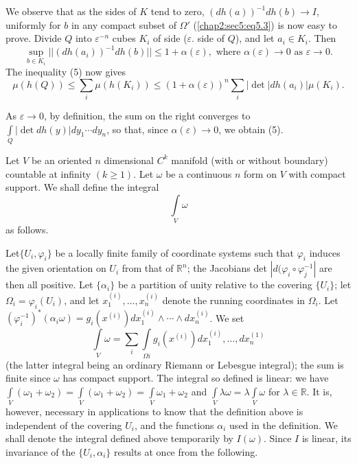 We observe that as the sides of $K$ tend to zero, $(dh(a))^{-1} dh(b)
\to I$, uniformly for $b$ in any compact subset of $\Omega '$
(\ref{chap2:sec5:eq5.3}) is
now easy to prove. Divide $Q$ into $\varepsilon^{-n}$ cubes $K_i$ of
side ($\varepsilon$. side of $Q$), and let $a_i \in K_i$. Then 
$$
\sup_{b \in K_i} || (dh(a_i))^{-1} dh(b) || \leq 1 + \alpha
(\varepsilon), \text{ where } \alpha (\varepsilon) \to 0 \text{ as  }
\varepsilon \to 0. 
$$
The inequality (5) now gives	
$$
\mu (h(Q)) \leq \sum_i \mu (h(K_i)) \leq (1 + \alpha (\varepsilon))^n
\sum_i |\det| dh(a_i) | \mu (K_i). 
$$

As $\varepsilon \to 0$, by definition, the sum on the right converges
to $\int \limits_{Q} |\det dh(y)| dy_{1}\cdots dy_n$, so that, since
$\alpha (\varepsilon) \to 0$, we obtain (5). 


Let $V$ be an oriented $n$ dimensional $C^k$ manifold (with or without
boundary) countable at infinity $(k \geq 1)$. Let $\omega$ be a
continuous $n$ form on $V$ with compact support. We shall define the
integral  
$$
\int \limits_V \omega
$$
as follows.

Let\pageoriginale $\{ U_i, \varphi_i\}$ be a locally finite family of coordinate
systems such that $\varphi_i$ induces the given orientation on $U_i$
from that  of $\mathbb{R}^n$; the Jacobians det $ | d (\varphi_i \circ
\varphi^{-1}_j |$ are then all positive. Let $\{\alpha_i \}$ be a
partition of unity relative to the covering $\{ U_i \}$; let
$\Omega_i = \varphi_i (U_i)$, and let $x^{(i)}_1 , \ldots , x^{(i)}_n$
denote the running coordinates 	in $\Omega_i$. Let $(\varphi^{-1}_i)^*
(\alpha_i \omega) = g_i (x^{(i)}) d x^{(i)}_1 \wedge \cdots \wedge
dx^{(i)}_n$. We set  
$$
\int \limits_{V} \omega = \sum_i \int \limits_{\Omega i} g_i (x^{(i)})
dx^{(i)}_1, \ldots , dx^{(1)}_n 
$$
(the latter integral being an ordinary Riemann or Lebesgue integral);
the sum is finite since $\omega$ has compact support. The integral so
defined is linear: we have $\int \limits_{V} (\omega_1 + \omega_2) =
\int \limits_{V} (\omega_1 +\omega_2) =  \int \limits_{V} \omega_1+
\omega_2$ and $\int\limits_V \lambda \omega = \lambda \int \limits_V
\omega$ for $\lambda \in \mathbb{R}$. It is, however, necessary in
applications to know that the definition above is independent of the
covering $U_i$, and the functions $\alpha_i$ used in the
definition. We shall denote the integral defined above temporarily by
$I (\omega)$. Since $I$ is linear, its invariance of the $\{ U_i ,
\alpha_i \}$ results at once from the following. 

